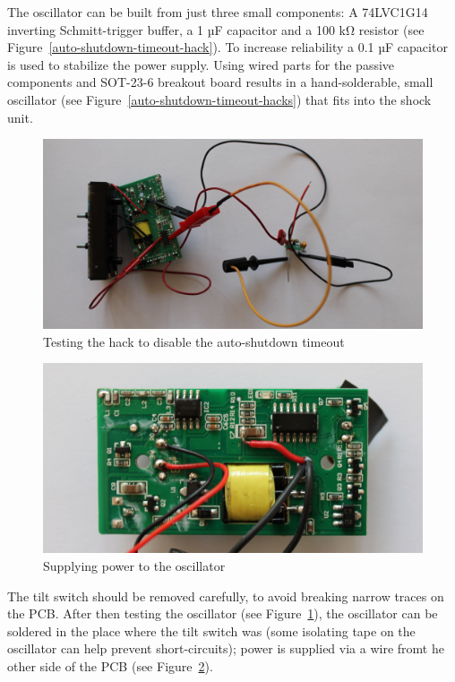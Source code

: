 \documentclass[a4paper]{article}
\begin{document}
The oscillator can be built from just three small components: A 74LVC1G14 inverting Schmitt-trigger buffer, a 1 µF capacitor and a 100 k\si{\ohm} resistor (see Figure~\ref{auto-shutdown-timeout-hack}). To increase reliability a 0.1 µF capacitor is used to stabilize the power supply. Using wired parts for the passive components and SOT-23-6 breakout board results in a hand-solderable, small oscillator (see Figure~\ref{auto-shutdown-timeout-hacks}) that fits into the shock unit.

\begin{figure}
	\centerline{\includegraphics[scale=0.15]{auto-shutdown-timeout-hack-first-test.jpeg}}
	\caption{\label{auto-shutdown-timeout-hack-first-test}Testing the hack to disable the auto-shutdown timeout}
\end{figure}

\begin{figure}
	\centerline{\includegraphics[scale=0.1]{auto-shutdown-timeout-hack-supply.jpeg}}
	\caption{\label{auto-shutdown-timeout-hack-supply}Supplying power to the oscillator}
\end{figure}

The tilt switch should be removed carefully, to avoid breaking narrow traces on the PCB.
After then testing the oscillator (see Figure~\ref{auto-shutdown-timeout-hack-first-test}), the oscillator can be soldered in the place where the tilt switch was (some isolating tape on the oscillator can help prevent short-circuits); power is supplied via a wire fromt he other side of the PCB (see Figure~\ref{auto-shutdown-timeout-hack-supply}).
\end{document}

